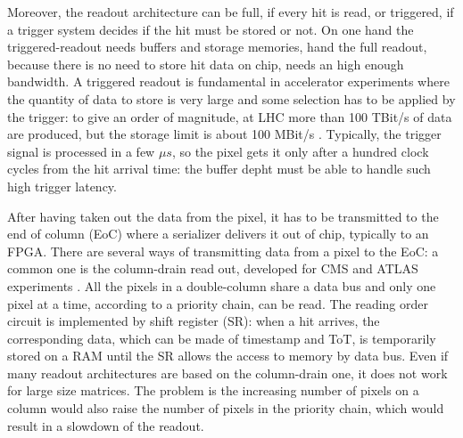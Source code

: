    Moreover, the readout architecture can be full, if every hit is read, or triggered, if a trigger system decides if the hit must be stored or not. On one hand the triggered-readout needs buffers and storage memories,  hand the full readout, because there is no need to store hit data on chip, needs an high enough bandwidth.
   A triggered readout is fundamental in accelerator experiments where the quantity of data to store is very large and some selection has to be applied by the trigger: to give an order of magnitude, at LHC more than 100 TBit/s of data are produced, but the storage limit is about 100 MBit/s \cite{K-Wermes}.
   Typically, the trigger signal is processed in a few $\mu s$, so the pixel gets it only after a hundred clock cycles from the hit arrival time: the buffer depht must be able to handle such high trigger latency. 
 
   After having taken out the data from the pixel, it has to be transmitted to the end of column (EoC) where a serializer delivers it out of chip, typically to an FPGA.
   There are several ways of transmitting data from a pixel to the EoC: a common one is the column-drain read out, developed for CMS and ATLAS experiments \cite{column-drain}. 
   All the pixels in a double-column share a data bus and only one pixel at a time, according to a priority chain, can be read. The reading order circuit is implemented by shift register (SR): when a hit arrives, the corresponding data, which can be made of timestamp and ToT, is temporarily stored on a RAM until the SR allows the access to memory by data bus. 
   Even if many readout architectures are based on the column-drain one, it does not work for large size matrices. The problem is the increasing number of pixels on a column would also raise the number of pixels in the priority chain, which would result in a slowdown of the readout. 

